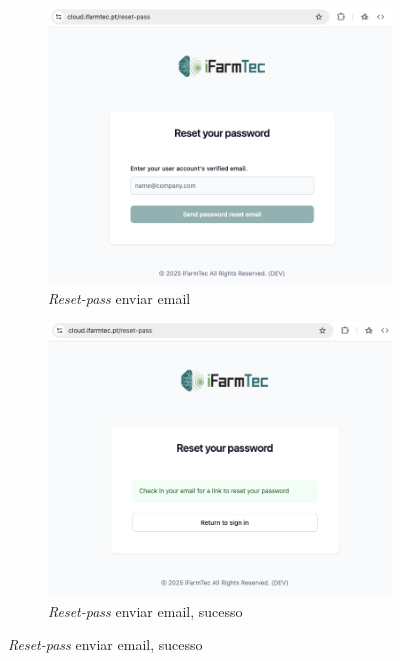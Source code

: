 \begin{figure}[h!]
	\centering
	\begin{subfigure}[c]{0.30\textwidth}
		\centering
		\includegraphics[width=\textwidth]{figs/reset-pass-1.png}
		\caption{\textit{Reset-pass} enviar email}
		\label{fig:resetPassEmail}
	\end{subfigure}
	\hfill
	\begin{subfigure}[c]{0.30\textwidth}
		\centering
		\includegraphics[width=\textwidth]{figs/reset-pass-2.png}
		\caption{\textit{Reset-pass} enviar email, sucesso}
		\label{fig:resetPassEmailSuc}
	\end{subfigure}


\end{figure}
